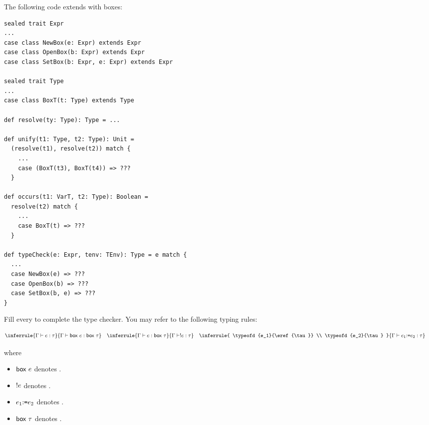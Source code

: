 \begin{exercise}

\item The following code extends \lang with boxes:
\begin{verbatim}
sealed trait Expr
...
case class NewBox(e: Expr) extends Expr
case class OpenBox(b: Expr) extends Expr
case class SetBox(b: Expr, e: Expr) extends Expr

sealed trait Type
...
case class BoxT(t: Type) extends Type

def resolve(ty: Type): Type = ...

def unify(t1: Type, t2: Type): Unit =
  (resolve(t1), resolve(t2)) match {
    ...
    case (BoxT(t3), BoxT(t4)) => ???
  }

def occurs(t1: VarT, t2: Type): Boolean =
  resolve(t2) match {
    ...
    case BoxT(t) => ???
  }

def typeCheck(e: Expr, tenv: TEnv): Type = e match {
  ...
  case NewBox(e) => ???
  case OpenBox(b) => ???
  case SetBox(b, e) => ???
}
\end{verbatim}

Fill every  to complete the type checker.
You may refer to the following typing rules:

\[
    \inferrule
    { \typeofd{e}{\tau} }
    { \typeofd{\eref{e}}{\eref{\tau}} }
    \quad
    \inferrule
    { \typeofd{e}{\eref{\tau}} }
    { \typeofd{\ederef{e}}{\tau} }
    \quad
    \inferrule
    { \typeofd{e_1}{\eref{\tau}} \\
      \typeofd{e_2}{\tau} }
    { \typeofd{\eset{e_1}{e_2}}{\tau} }
\]

where

\begin{itemize}
  \item $\textsf{box}\ e$ denotes .
  \item $!e$ denotes .
  \item $e_1{:}\texttt{=} e_2$ denotes .
  \item $\textsf{box}\ \tau$ denotes .
\end{itemize}

\end{exercise}

